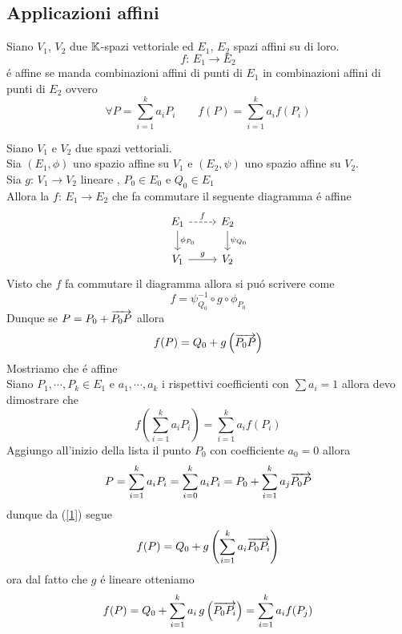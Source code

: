 \subsection{Applicazioni affini}
\begin{defn}\bianco
Siano $V_1$, $V_2$ due $\mathbb{K}$-spazi vettoriale ed $E_1$, $E_2$ spazi affini su di loro.\\
$$f:\, E_1 \to E_2 $$ 
\'e affine se manda combinazioni affini di punti di $E_1$ in combinazioni affini di punti di $E_2$ ovvero 
$$ \forall P = \sum_{i=1}^k a_i P_i  \qquad f(P) = \sum_{i=1}^k a_i f(P_i)$$
\end{defn}
\spazio
\begin{prop}Siano $V_1$ e $V_2 $ due spazi vettoriali.\\
Sia $(E_1, \phi) $ uno spazio affine su $V_1 $ e $(E_2, \psi)$ uno spazio affine su $V_2$.\\
Sia $g:\, V_1 \to V_2 $  lineare , $P_0 \in E_0 $ e $Q_0 \in E_1$\\
Allora la $f:\, E_1 \to E_2 $ che fa commutare il seguente diagramma \'e affine 
$$ \begin{tikzcd} 
E_1 \arrow[r,dashed,"f"]
	  \arrow{d}{\phi_{P_0}} &E_2 \arrow{d}{\psi_{Q_0}} \\ V_1 \arrow[r,"g"] & V_2 
\end{tikzcd}$$
\proof Visto che $f$ fa commutare il diagramma allora si pu\'o scrivere come 
$$ f = \psi_{Q_0}^{-1} \circ g \circ \phi_{P_0}$$
Dunque se $P= P_0 + \overrightarrow{P_0P}$ allora
\begin{equation}\label{1}
 f(P) = Q_0 + g\left(  \overrightarrow{P_0 P }  \right)
\end{equation}
Mostriamo che \'e affine\\
Siano $P_1, \cdots , P_k \in E_1 $ e $a_1, \cdots ,a_k $ i rispettivi coefficienti con $\sum a_i =1 $
allora devo dimostrare che 
$$ f\left( \sum_{i=1}^k a_i P_i \right) = \sum_{i=1}^k a_i f(P_i)$$
Aggiungo all'inizio della lista il punto $P_0$ con coefficiente $a_0=0$ allora
$$ P = \sum_{i=1}^k a_i P_i = \sum_{i=0}^k a_i P_i = P_0 + \sum_{i=1}^k a_j \overrightarrow{P_0 P } $$ dunque da (\ref{1}) segue 
$$ f(P) = Q_0 + g \left( \sum_{i=1}^k a_i \overrightarrow { P_0 P_i }\right) $$ ora dal fatto che $g$ \'e lineare otteniamo 
$$ f(P) = Q_0 + \sum_{i=1}^k a_i \, g \left( \overrightarrow{ P_0 P_i } \right) = \sum_{i=1}^k a_i f ( P_j ) $$
\endproof
\end{prop}

